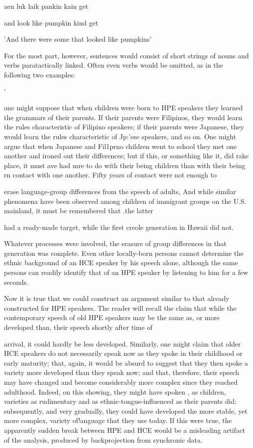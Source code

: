 \ea\label{ex:14}
 aen luk laik pankin kain get
\glt
\z

and look like pumpkin kind get

'And there were some that looked like pumpkins'

For the most part, however, sentences would consist of short strings of nouns and verbs paratactically linked. Often even verbs would be omitted, as in the following two examples:

'

one might suppose that when children were born to HPE speakers they learned the grammars of their parents. If their parents were Filipinos, they would learn the rules characteristic of Filipino speakers; if their parents were Japanese, they would learn the rules characteristic of Jp{\textquotedbl}:'ese speakers, and so on. One might argue that when Japanese and Fil1prno children went to school they met one another and ironed out their differences; but if this, or something like it, did rake place, it must ave had mre to do with their being children than with their being rn contact with one another. Fifty years of contact were not enough to

erase language-group differences from the speech of adults, And while similar phenomena have been observed among children of immigrant groups on the U.S. mainland, it must be remembered that .the latter

had a ready-made target, while the first creole generation in Hawaii did not.

Whatever processes were involved, the erasure of group differ\-ences in that generation was complete. Even other locally-born persons cannot determine the ethnic background of an HCE speaker by his speech alone, although the same persons can readily identify that of an HPE speaker by listening to him for a few seconds.

Now it is true that we could construct an argument similar to that already constructed for HPE speakers. The reader will recall the claim that while the contemporary speech of old HPE speakers may be the same as, or more developed than, their speech shortly after time of


arrival, it could hardly be less developed. Similarly, one might claim that older HCE speakers do not necessarily speak now as they spoke in their childhood or early maturity; that, again, it would be absurd to suggest that they then spoke a variety more developed than they speak now; and that, therefore, their speech may have changed and become considerably more complex since they reached adulthood. Indeed, on this showing, they might have spoken , as children, varieties as rudimentary and as ethnic-tongue-influenced as their parents did; subsequently, and very gradually, they could have developed the more stable, yet more complex, variety of!anguage that they use today. If this were true, the apparently sudden break between HPE and HCE would be a misleading artifact of the analysis, produced by back\-projection from synchronic data.

